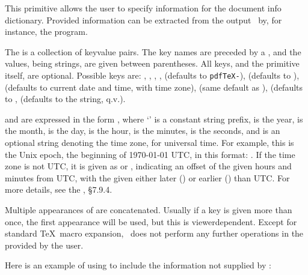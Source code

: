 \documentclass{pdftexmanual}
\begin{document}
This primitive allows the user to specify information for the document
info dictionary. Provided information can be extracted from the output
\PDF\ by, for instance, the  program.

The  is a collection of key\hyph value\hyph
pairs. The key names are preceded by a \type{/}, and the values, being
strings, are given between parentheses. All keys, and the primitive
itself, are optional. Possible
keys are:\newline
{},\newline
{},\newline
{},\newline
{},\newline
{} (defaults to \hbox{\tt pdfTeX-\currentpdftex}),\newline
{} (defaults to ),\newline
{} (defaults to current date and time, with time zone),\newline
{} (same default as ),\newline
{} (defaults to ,\newline
{} (defaults to the  string, q.v.).

 and  are expressed in the form
, where `' is a constant string
prefix,  is the year,  is the month,  is
the day,  is the hour,  is the minutes,  is
the seconds, and  is an optional string denoting the time zone,
 for universal time. For example, this is the Unix epoch, the
beginning of 1970-01-01 UTC, in this format: .
If the time zone is not UTC, it is given as  or
, indicating an offset of the given hours and minutes from
UTC, with the given either later (\type{+}) or earlier (\type{-}) than
UTC. For more details, see the \PDFReference, \S7.9.4.

Multiple appearances of  are concatenated. Usually if a key
is given more than once, the first appearance will be used, but this is
viewer\hyph dependent. Except for standard \TeX\ macro expansion,
\PDFTEX\ does not perform any further operations in the
 provided by the user.

Here is an example of using  to include the
information not supplied by \PDFTEX:
\end{document}
